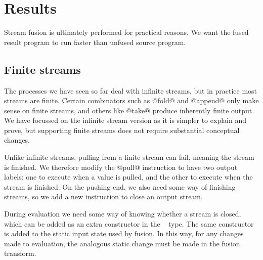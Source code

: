 

\eject
\section{Results}
\label{s:Evaluation}

Stream fusion is ultimately performed for practical reasons. We want the fused result program to run faster than unfused source program.

\subsection{Finite streams}
\label{s:Finite}

The processes we have seen so far deal with infinite streams, but in practice most streams are finite. Certain combinators such as @fold@ and @append@ only make sense on finite streams, and others like @take@ produce inherently finite output. We have focussed on the infinite stream version as it is simpler to explain and prove, but supporting finite streams does not require substantial conceptual changes.

Unlike infinite streams, pulling from a finite stream can fail, meaning the stream is finished. We therefore modify the @pull@ instruction to have two output labels: one to execute when a value is pulled, and the other to execute when the stream is finished. On the pushing end, we also need some way of finishing streams, so we add a new instruction to close an output stream.

During evaluation we need some way of knowing whether a stream is closed, which can be added as an extra constructor in the \InputState~ type. The same constructor is added to the static input state used by fusion. In this way, for any changes made to evaluation, the analogous static change must be made in the fusion transform.



